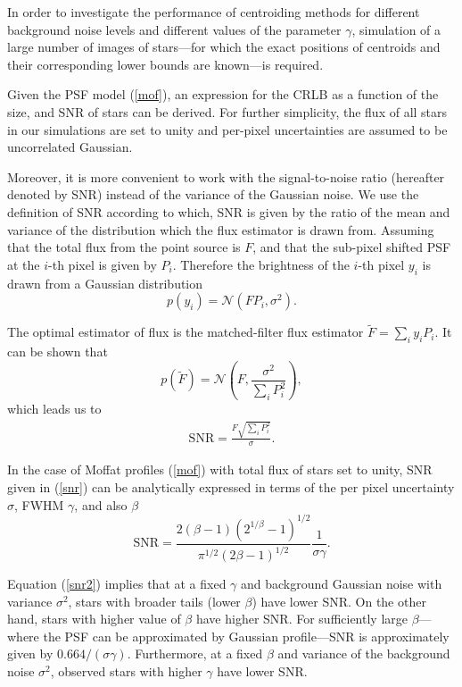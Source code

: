 \documentclass[12pt, preprint]{aastex}
\newcommand{\beq}{\begin{equation}}
\newcommand{\eeq}{\end{equation}}
\begin{document}
In order to investigate the performance of centroiding methods for
 different background noise levels and different
values of the parameter $\gamma$, simulation of a large number of images of stars---for which the exact positions of centroids
and their corresponding lower bounds are known---is required.

Given the PSF model (\ref{mof}), an expression for the CRLB as a function of the size, and SNR of stars can be 
derived. For further simplicity, the flux of all stars in our simulations are set to unity and per-pixel 
uncertainties are assumed to be uncorrelated Gaussian.

Moreover, it is more convenient to work with the signal-to-noise ratio
(hereafter denoted by SNR) instead of the variance of the Gaussian noise.
We use the definition of SNR according to which, SNR is given by the ratio
 of the mean and variance of the distribution
which the flux estimator is drawn from. Assuming that the total flux from
the point source is $F$, and that the sub-pixel shifted PSF at the $i$-th pixel is given
by $P_{i}$. Therefore the brightness of the $i$-th pixel $y_{i}$ is drawn from
a Gaussian distribution 
\beq
p(y_{i}) = \mathcal{N}(FP_{i},\sigma^{2}). 
\eeq

The optimal estimator of flux is the matched-filter flux estimator 
$\tilde{F}=\sum_{i}y_{i}P_{i}$. It can be shown that 
\beq
p(\tilde{F}) = \mathcal{N}(F , \frac{\sigma^{2}}{\sum_{i}P_{i}^{2}}),
\eeq  
which leads us to
\beq
\begin{array}{l}
\text{SNR} = \frac{F\sqrt{\sum_{i} P_{i}^{2}}}{\sigma}.
\end{array}
\label{snr}
\eeq

 In the case of Moffat profiles (\ref{mof}) with total flux of stars set to unity, 
SNR given in (\ref{snr}) can be analytically 
expressed in terms of the per pixel uncertainty
$\sigma$, FWHM $\gamma$, and also $\beta$
\beq
\text{SNR} = \frac{2(\beta-1)(2^{1/\beta}-1)^{1/2}}{\pi^{1/2}(2\beta-1)^{1/2}}\frac{1}{\sigma \gamma}.
\label{snr2}
\eeq

Equation (\ref{snr2}) implies that at a fixed $\gamma$ and background Gaussian noise 
with variance $\sigma^{2}$, stars with broader tails (lower $\beta$) have lower SNR.
On the other hand, stars with higher value of $\beta$ have higher SNR. 
For sufficiently large $\beta$---where the PSF can be
approximated by Gaussian profile---SNR is approximately given by $0.664/(\sigma\gamma)$.
Furthermore, at a fixed $\beta$ and variance of the background noise $\sigma^{2}$,
observed stars with higher $\gamma$ have lower SNR.  
\end{document}
